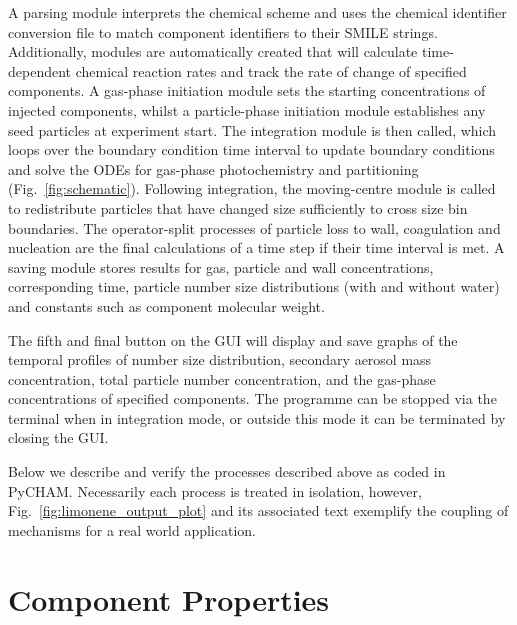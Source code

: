 \documentclass[gmd, manuscript]{copernicus}
\begin{document}
A parsing module interprets the chemical scheme and uses the chemical identifier conversion file to match component identifiers to their SMILE strings.  Additionally, modules are automatically created that will calculate time-dependent chemical reaction rates and track the rate of change of specified components.  A gas-phase initiation module sets the starting concentrations of injected components, whilst a particle-phase initiation module establishes any seed particles at experiment start.  The integration module is then called, which loops over the boundary condition time interval to update boundary conditions and solve the ODEs for gas-phase photochemistry and partitioning (Fig.~\ref{fig:schematic}).  Following integration, the moving-centre module is called to redistribute particles that have changed size sufficiently to cross size bin boundaries.  The operator-split processes of particle loss to wall, coagulation and nucleation are the final calculations of a time step if their time interval is met.  A saving module stores results for gas, particle and wall concentrations, corresponding time, particle number size distributions (with and without water) and constants such as component molecular weight.

The fifth and final button on the GUI will display and save graphs of the temporal profiles of number size distribution, secondary aerosol mass concentration, total particle number concentration, and the gas-phase concentrations of specified components.  The programme can be stopped via the terminal when in integration mode, or outside this mode it can be terminated by closing the GUI.

Below we describe and verify the processes described above as coded in PyCHAM.  Necessarily each process is treated in isolation, however, Fig.~\ref{fig:limonene_output_plot} and its associated text exemplify the coupling of mechanisms for a real world application.

\section{Component Properties}\label{sec:prop}
\end{document}
